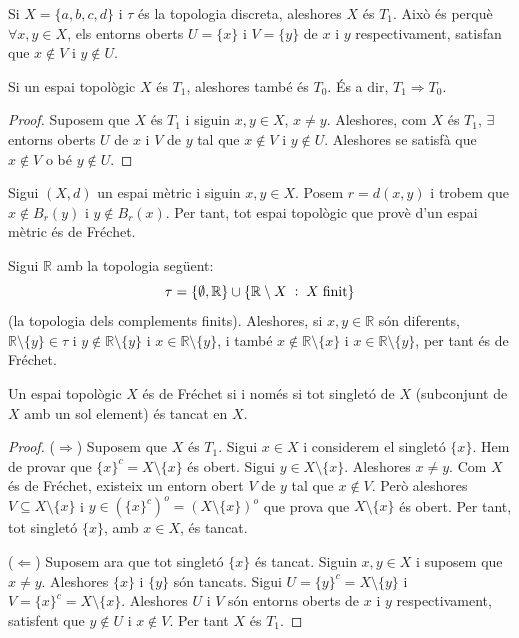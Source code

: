 \documentclass[../main.tex]{subfiles}
\begin{document}
\begin{ej}
\label{ej:frechet1} Si $X = \{a,b,c,d\}$ i $\tau$ és la topologia discreta, aleshores $X$ és $T_1$. Això és perquè $\forall x,y\in  X$, els entorns oberts $U = \{x\}$ i $V=\{y\}$ de $x$ i $y$ respectivament, satisfan que $x\not\in V$ i $y\not\in U$.
\end{ej}

\begin{ter}
\label{ter:t1implicat0} Si un espai topològic $X$ és $T_1$, aleshores també és $T_0$. És a dir, $T_1\Rightarrow T_0$.
\end{ter}
\begin{proof}
Suposem que $X$ és $T_1$ i siguin $x,y\in X$, $x\not=y$. Aleshores, com $X$ és $T_1$, $\exists$ entorns oberts $U$ de $x$ i $V$ de $y$ tal que $x\not\in V$ i $y\not\in U$. Aleshores se satisfà que $x\not\in V$ o bé $y\not\in U$.
\end{proof}

\begin{ej}
\label{ej:frechet2} Sigui $(X,d)$ un espai mètric i siguin $x,y\in X$. Posem $r = d(x,y)$ i trobem que $x\not\in B_r(y)$ i $y\not\in B_r(x)$. Per tant, tot espai topològic que provè d'un espai mètric és de Fréchet.
\end{ej}

\begin{ej}
\label{ej:frechet3} Sigui $\mathbb{R}$ amb la topologia següent:
\begin{equation}
    \notag
    \tau = \{\emptyset,\mathbb{R}\}\cup\{\mathbb{R}\setminus X\;:\;X\;\text{finit}\} 
\end{equation}
(la topologia dels complements finits). Aleshores, si $x,y\in \mathbb{R}$ són diferents, $\mathbb{R}\setminus\{y\}\in\tau$ i $y\not\in \mathbb{R}\setminus\{y\}$ i $x\in\mathbb{R}\setminus\{y\}$, i també $x\not\in\mathbb{R}\setminus\{x\}$ i $x\in\mathbb{R}\setminus\{y\}$, per tant és de Fréchet.
\end{ej}

\begin{prop}
\label{prop:frechet} Un espai topològic $X$ és de Fréchet si i només si tot singletó de $X$ (subconjunt de $X$ amb un sol element) és tancat en $X$.
\end{prop}
\begin{proof}
($\Rightarrow$) Suposem que $X$ és $T_1$. Sigui $x\in X$ i considerem el singletó $\{x\}$. Hem de provar que $\{x\}^c = X\setminus\{x\}$ és obert. Sigui $y\in X\setminus\{x\}$. Aleshores $x\not=y$. Com $X$ és de Fréchet, existeix un entorn obert $V$ de $y$ tal que $x\not\in V$. Però aleshores $V\subseteq X\setminus\{x\}$ i $y\in\left(\{x\}^c\right)^{o} = \left(X\setminus\{x\}\right)^{o}$ que prova que $X\setminus\{x\}$ és obert. Per tant, tot singletó $\{x\}$, amb $x\in X$, és tancat.

($\Leftarrow$) Suposem ara que tot singletó $\{x\}$ és tancat. Siguin $x,y\in X$ i suposem que $x\not=y$. Aleshores $\{x\}$ i $\{y\}$ són tancats. Sigui $U = \{y\}^c = X\setminus\{y\}$ i $V = \{x\}^c = X\setminus\{x\}$. Aleshores $U$ i $V$ són entorns oberts de $x$ i $y$ respectivament, satisfent que $y\not\in U$ i $x\not\in V$. Per tant $X$ és $T_1$.
\end{proof}
\end{document}
